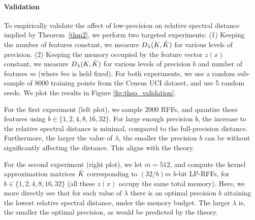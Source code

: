 



\paragraph{Validation} To empirically validate the affect of low-precision on relative spectral distance implied by Theorem~\ref{thm2}, we perform two targeted experiments: (1) Keeping the number of features constant, we measure $D_{\lambda}(K,\tilde{K})$ for various levels of precision. 
(2) Keeping the memory occupied by the feature vector $z(x)$ constant, we measure $D_{\lambda}(K,\tilde{K})$ for various levels of precision $b$ and number of features $m$ (where $bm$ is held fixed). For both experiments, we use a random sub-sample of $8000$ training points from the Census UCI dataset, and use 5 random seeds.  We plot the results in Figure \ref{fig:theo_validation}. 

For the first experiment (left plot), we sample 2000 RFFs, and quantize these features using $b \in \{1,2,4,8,16,32\}$. For large enough precision $b$, the increase to the relative spectral distance is minimal, compared to the full-precision distance. Furthermore, the larger the value of $\lambda$, the smaller the precision $b$ can be without significantly affecting the distance.  This aligns with the theory.%

For the second experiment (right plot), we let $m = 512$, and compute the kernel approximation matrices $\tilde{K}$ corresponding to $(32/b)m$ $b$-bit LP-RFFs, for $b \in \{1,2,4,8,16,32\}$ (all these $z(x)$ occupy the same total memory). Here, we more directly see that for each value of $\lambda$ there is an optimal precision $b$ attaining the lowest relative spectral distance, under the memory budget.  The larger $\lambda$ is, the smaller the optimal precision, as would be predicted by the theory.

